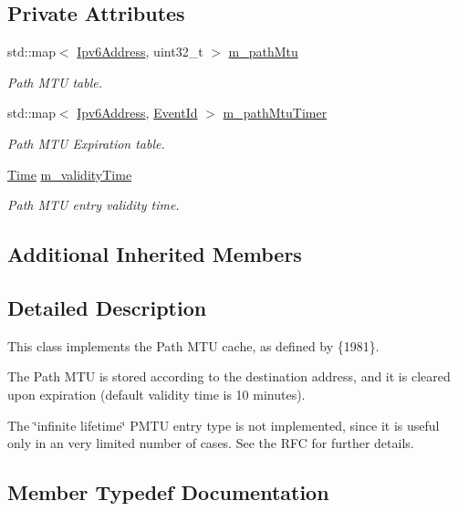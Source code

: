 \subsection*{Private Attributes}
\begin{DoxyCompactItemize}
\item 
std\+::map$<$ \hyperlink{classns3_1_1Ipv6Address}{Ipv6\+Address}, uint32\+\_\+t $>$ \hyperlink{classns3_1_1Ipv6PmtuCache_a585f564725b0017c22fb0a25029d481e}{m\+\_\+path\+Mtu}
\begin{DoxyCompactList}\small\item\em Path M\+TU table. \end{DoxyCompactList}\item 
std\+::map$<$ \hyperlink{classns3_1_1Ipv6Address}{Ipv6\+Address}, \hyperlink{classns3_1_1EventId}{Event\+Id} $>$ \hyperlink{classns3_1_1Ipv6PmtuCache_a8f494fe1cc83f8e026bf68fd8e19a2e7}{m\+\_\+path\+Mtu\+Timer}
\begin{DoxyCompactList}\small\item\em Path M\+TU Expiration table. \end{DoxyCompactList}\item 
\hyperlink{classns3_1_1Time}{Time} \hyperlink{classns3_1_1Ipv6PmtuCache_aad204229ec877a85eaebb1e9dd0f01d2}{m\+\_\+validity\+Time}
\begin{DoxyCompactList}\small\item\em Path M\+TU entry validity time. \end{DoxyCompactList}\end{DoxyCompactItemize}
\subsection*{Additional Inherited Members}


\subsection{Detailed Description}
This class implements the Path M\+TU cache, as defined by \{1981\}. 

The Path M\+TU is stored according to the destination address, and it is cleared upon expiration (default validity time is 10 minutes).

The \char`\"{}infinite lifetime\char`\"{} P\+M\+TU entry type is not implemented, since it is useful only in an very limited number of cases. See the R\+FC for further details. 

\subsection{Member Typedef Documentation}

